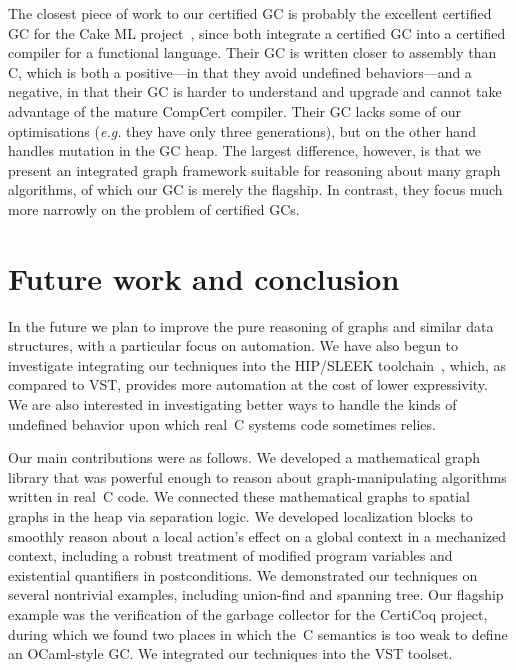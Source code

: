 \documentclass[acmsmall,screen]{acmart}
\newcommand\hide[1]{}
\begin{document}
The closest piece of work to our certified GC is probably the excellent certified GC
for the Cake ML project~\cite{cakemlgc}, since both integrate a certified GC into 
a certified compiler for a functional language.  Their GC is written closer to assembly 
than C, which is both a positive---in that they avoid undefined behaviors---and a negative, 
in that their GC is harder to understand and upgrade and cannot take advantage of the
mature CompCert compiler.  Their GC lacks some of our optimisations (\emph{e.g.} they have 
only three generations), but on the other hand handles mutation in the GC heap.  The largest 
difference, however, is that we present an integrated graph framework suitable for reasoning 
about many graph algorithms, of which our GC is merely the flagship.  In contrast, they focus 
much more narrowly on the problem of certified GCs.
 
\section{Future work and conclusion}
\label{sec:future}
\label{sec:conclusion}
In the future we plan to improve the pure reasoning of graphs and
similar data structures, with a particular focus on automation.  We have
also begun to investigate integrating our techniques into the 
HIP/SLEEK toolchain~\cite{chin:hipsleek}, which, as compared to VST, 
provides more automation at the cost of lower expressivity.  We
are also interested in investigating better ways to handle the
kinds of undefined behavior upon which real~C systems code sometimes
relies.

\hide{\color{magenta}We are in the process of verifying a garbage
collector for the ``CertiCoq'' project, which is building
a certified compiler from Gallina to Clight. We would like to investigate
using our externally verified lemmas in HIP/SLEEK to verify code such as fast
exponentiation and more graph algorithms. We also would like to make
the interface between Coq and H/S simpler and cleaner.
One final direction we would like to investigate is using our new
connection to Coq to have H/S output certificates as it
verifies programs so that the system becomes more trustworthy.}

Our main contributions were as follows.  We developed a mathematical
graph library that was powerful enough to reason about graph-manipulating
algorithms written in real~C code.  We connected these mathematical graphs
to spatial graphs in the heap via separation logic.  We developed 
localization blocks to smoothly reason about a local action's effect on
a global context in a mechanized context, including a robust treatment
of modified program variables and existential quantifiers in postconditions.
We demonstrated our techniques on several nontrivial examples, including union-find
and spanning tree.  Our flagship example was the verification of the garbage collector 
for the CertiCoq project, during which we found two places in which the~C semantics
is too weak to define an OCaml-style GC.  We integrated our techniques into the
VST toolset. 
\end{document}
